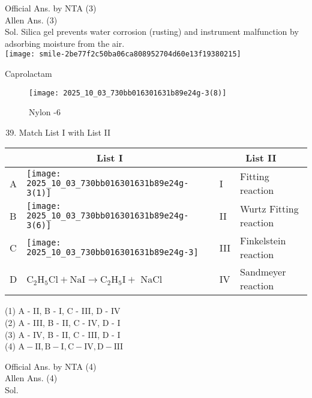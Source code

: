 \documentclass[10pt]{article}
\begin{document}
Official Ans. by NTA (3)\\
Allen Ans. (3)\\
Sol. Silica gel prevents water corrosion (rusting) and instrument malfunction by adsorbing moisture from the air.\\
\texttt{[image: smile-2be77f2c50ba06ca808952704d60e13f19380215]}

Caprolactam

\begin{figure}[h]
\begin{center}
  \texttt{[image: 2025\_10\_03\_730bb016301631b89e24g-3(8)]}
\captionsetup{labelformat=empty}
\caption{Nylon -6}
\end{center}
\end{figure}

\begin{enumerate}
  \setcounter{enumi}{38}
  \item Match List I with List II
\end{enumerate}

\begin{center}
\begin{tabular}{|l|l|l|l|}
\hline
\multicolumn{2}{|c|}{List I} & \multicolumn{2}{|c|}{List II} \\
\hline
A & \texttt{[image: 2025\_10\_03\_730bb016301631b89e24g-3(1)]}
 & I & Fitting reaction \\
\hline
B & \texttt{[image: 2025\_10\_03\_730bb016301631b89e24g-3(6)]}
 & II & Wurtz Fitting reaction \\
\hline
C & \texttt{[image: 2025\_10\_03\_730bb016301631b89e24g-3]}
 & III & Finkelstein reaction \\
\hline
D & \(\mathrm{C}_{2} \mathrm{H}_{5} \mathrm{Cl}+\mathrm{NaI} \rightarrow \mathrm{C}_{2} \mathrm{H}_{5} \mathrm{I}+\) NaCl & IV & Sandmeyer reaction \\
\hline
\end{tabular}
\end{center}

(1) A - II, B - I, C - III, D - IV\\
(2) A - III, B - II, C - IV, D - I\\
(3) A - IV, B - II, C - III, D - I\\
(4) \(\mathrm{A}-\mathrm{II}, \mathrm{B}-\mathrm{I}, \mathrm{C}-\mathrm{IV}, \mathrm{D}-\mathrm{III}\)

Official Ans. by NTA (4)\\
Allen Ans. (4)\\
Sol.
\end{document}
